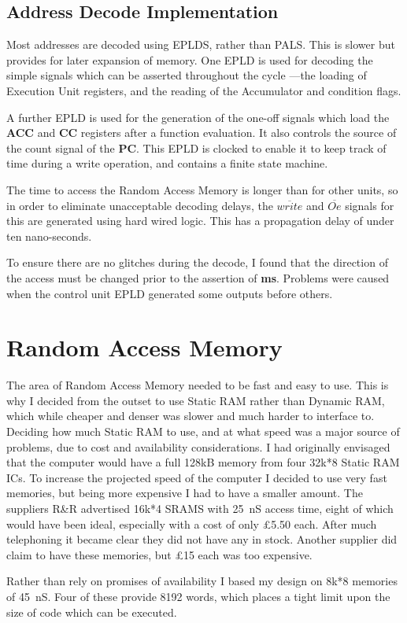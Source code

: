 \subsection{Address Decode Implementation}

Most addresses are  decoded using EPLDS, rather than PALS. This 
is slower but provides for  later expansion of memory.
 One EPLD is  used 
for decoding the simple signals which can be asserted throughout the 
cycle ---the loading of   Execution Unit registers, and the reading of the Accumulator and  condition flags.

A further EPLD is  used for the generation of the one-off signals which    
load the {\bf ACC} and {\bf CC} registers after a function evaluation. 
It also controls the source of the count signal of the {\bf PC}.
 This EPLD 
is clocked to enable it to keep track of time during a write operation, and  contains a finite state machine.

The time to access the Random Access Memory is longer than for  other units, so in order to eliminate unacceptable decoding delays, the $\overline{write}$ and $\overline{Oe}$ signals for this are generated using hard wired logic. This  has a propagation delay of under ten nano-seconds.

To ensure there are no glitches during the decode, I found that the direction of the access must be changed prior to the assertion of {\bf ms}. Problems were caused when the control unit EPLD generated some outputs before others.

\section{Random Access Memory}

The  area of Random Access Memory  needed to be  fast and easy to use. 
This is why I decided from the outset to use Static RAM rather than Dynamic RAM, which while cheaper and denser was slower and much harder to interface to.
Deciding how much Static RAM to use, and at what speed  was a major source of problems,  due to cost and 
availability considerations.  
I had  originally envisaged that the computer would 
have a full 128kB memory from four 32k*8 Static RAM ICs. 
To increase the  projected speed of the computer I decided to  
 use very fast memories, but  being more expensive I had to have a 
 smaller amount.
 The suppliers R\&R advertised 16k*4 SRAMS with 25~nS access time, eight of which would have been ideal, 
especially with a cost of only \pounds 5.50 each. After much telephoning it 
became clear they did not have any in stock.  Another supplier did claim to have these memories, but 
\pounds 15 each was too expensive. 

Rather than rely on promises of availability I based my design on 8k*8 
memories of 45~nS.  
Four of these provide 8192 words,
which  places a tight limit upon the size of code which can be executed.


